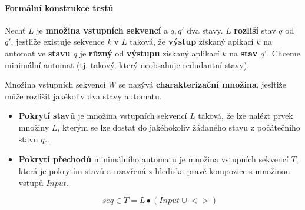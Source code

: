 \paragraph{Formální konstrukce testů}

Nechť $L$ je \textbf{množina vstupních sekvencí} a $q, q'$ dva stavy. $L$ \textbf{rozliší} stav $q$ od $q'$, jestliže existuje sekvence $k$ v $L$ taková, že \textbf{výstup} získaný apikací $k$ na automat ve \textbf{stavu $q$} je \textbf{různý} od \textbf{výstupu} získaný aplikací $k$ na \textbf{stav $q'$}. Chceme minimální automat (tj. takový, který neobsahuje redudantní stavy).

Množina vstupních sekvencí $W$ se nazývá \textbf{charakterizační množina}, jesltiže může rozlišit jakékoliv dva stavy automatu.

\begin{itemize}[itemsep=0px]
\item \textbf{Pokrytí stavů} je množina vstupních sekvencí $L$ taková, že lze nalézt prvek množiny $L$, kterým se lze dostat do jakéhokoliv žádaného stavu z počátečního stavu $q_0$.
\item \textbf{Pokrytí přechodů} minimálního automatu je množina vstupních sekvencí $T$, která je pokrytím stavů a uzavřená z hlediska pravé kompozice s množinou vstupů $Input$.

$$seq \in T = L \bullet (Input \cup {<>})$$

\end{itemize}
